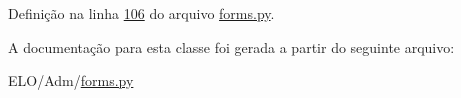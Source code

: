 Definição na linha \hyperlink{Adm_2forms_8py_source_l00106}{106} do arquivo \hyperlink{Adm_2forms_8py_source}{forms.\-py}.



A documentação para esta classe foi gerada a partir do seguinte arquivo\-:\begin{DoxyCompactItemize}
\item 
E\-L\-O/\-Adm/\hyperlink{Adm_2forms_8py}{forms.\-py}\end{DoxyCompactItemize}
